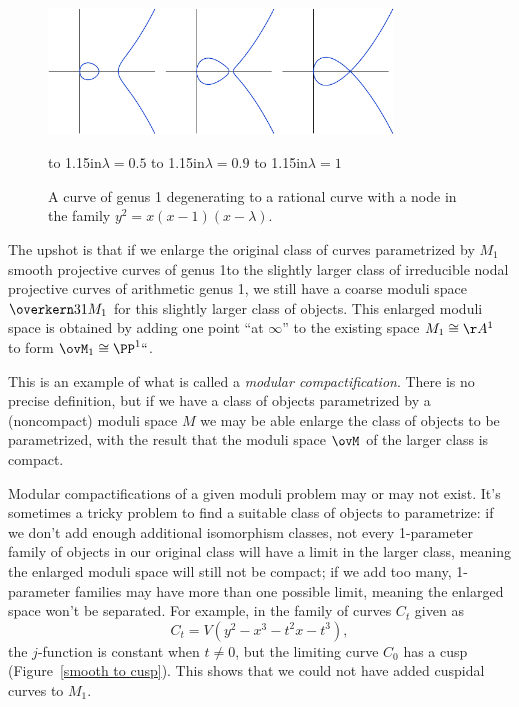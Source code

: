 \begin{figure}
\includegraphics[width=3.6in]{main/cubic-la=0.5,0.9,1}
\centerline{\hfil
\footnotesize
\hbox to 1.15in{\hfil\hfil$\lambda=0.5$\hfil}\enspace
\hbox to 1.15in{\hfil\hfil$\lambda=0.9$\hfil}\enspace
\hbox to 1.15in{\hfil\hfil$\lambda=1$\hfil}\hfil
}
\caption{A curve of genus 1 degenerating to a rational curve with a node
in the family $y^2 = x(x-1)(x - \lambda)$.}
\label{smooth to singular}
\end{figure}


The upshot
is that if we enlarge the original class of curves parametrized by
$M_1$\emdash smooth projective curves of genus 1\emdash to the
slightly larger class
of
irreducible nodal projective curves of
arithmetic genus 1, we still have a coarse moduli space $\overkern31
M_1$ for this slightly larger class of objects. This enlarged moduli
space is obtained by adding one point ``at $\infty$'' to the existing
space $M_1 \cong \AA^1$ to form $\ovM_1 \cong \PP^1` `$.

This is an example of what is called a
\emph{modular compactification}.
%
There is no precise definition, but if we have a
class of objects parametrized by a (noncompact) moduli space $M$ we
may be able enlarge the class of objects to be parametrized, with the
result that the moduli space $\ovM$ of the larger class is
compact.

Modular compactifications of a given moduli problem may or may not exist. It's sometimes a tricky problem to find a suitable class of objects to parametrize: if we don't add enough additional isomorphism classes, not every 1-parameter family of objects in our original class will have a limit in the larger class, meaning the enlarged moduli space will still not be compact; if we add too many,  1-parameter families may have more than one possible limit, meaning the enlarged space won't be separated. For example, in the family
 of curves $C_t$ given as
$$
C_t = V(y^2 -x^3 - t^2x - t^3)
,
$$
the $j$-function
is constant when $t\neq 0$, but  the limiting curve
$C_0$ has a
cusp
(Figure~\ref{smooth to cusp}). This shows that we could not have added
cuspidal curves to $M_1$.

